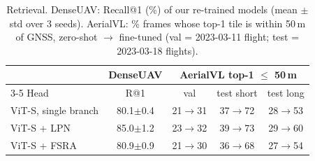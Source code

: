 \begin{table}[t]
\centering
\caption{Retrieval. DenseUAV: Recall@1 (\%) of our re-trained models (mean $\pm$ std over 3 seeds). AerialVL: \% frames whose top-1 tile is within 50\,m of GNSS, zero-shot $\rightarrow$ fine-tuned (val = 2023-03-11 flight; test = 2023-03-18 flights).}
\label{tab:retrieval}
\setlength{\tabcolsep}{3pt}
\small
\begin{tabular}{lcccc}
\toprule
 & DenseUAV & \multicolumn{3}{c}{AerialVL top-1 $\le$ 50\,m} \\
\cmidrule(lr){3-5}
Head & R@1 & val & test short & test long \\
\midrule
ViT-S, single branch & 80.1$\pm$0.4 & 21$\rightarrow$31 & 37$\rightarrow$72 & 28$\rightarrow$53 \\
ViT-S + LPN & 85.0$\pm$1.2 & 23$\rightarrow$32 & 39$\rightarrow$73 & 29$\rightarrow$60 \\
ViT-S + FSRA & 80.9$\pm$0.9 & 21$\rightarrow$30 & 36$\rightarrow$68 & 27$\rightarrow$54 \\
\bottomrule
\end{tabular}
\end{table}
